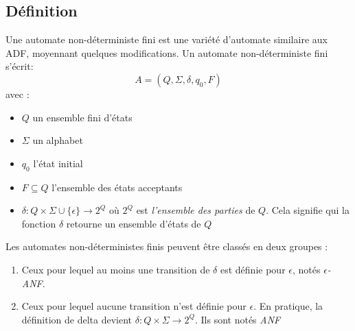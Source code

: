 \subsection{Définition}

Une automate non-déterministe fini est une variété d'automate similaire aux ADF, moyennant quelques modifications. Un automate non-déterministe fini s'écrit:
	$$
	A=(Q,\Sigma, \delta, q_0, F)
	$$
avec : 

\begin{itemize}
	\item $Q$ un ensemble fini d'états
	\item $\Sigma$ un alphabet
	\item $q_0$ l'état initial
	\item $F\subseteq Q$ l'ensemble des états acceptants
	\item $\delta : Q \times \Sigma \cup \{\epsilon\} \rightarrow 2^Q$ où $2^Q$ est \emph{l'ensemble des parties} de $Q$. Cela signifie qui la fonction $\delta$ retourne un ensemble d'états de $Q$
\end{itemize}

Les automates non-déterministes finis peuvent être classés en deux groupes :
\begin{enumerate}
	\item Ceux pour lequel au moins une transition de $\delta$ est définie pour $\epsilon$, notés $\epsilon$\emph{-ANF}.
	\item Ceux pour lequel aucune transition n'est définie pour $\epsilon$. En pratique, la définition de delta devient $\delta : Q \times \Sigma \rightarrow 2^Q$. Ils sont notés \emph{ANF}
\end{enumerate}

